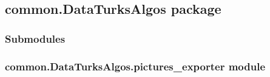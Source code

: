 \documentclass[letterpaper,10pt,english]{sphinxmanual}
\begin{document}
\subsection{common.DataTurksAlgos package}
\label{\detokenize{common.DataTurksAlgos:common-dataturksalgos-package}}\label{\detokenize{common.DataTurksAlgos::doc}}

\subsubsection{Submodules}
\label{\detokenize{common.DataTurksAlgos:submodules}}

\subsubsection{common.DataTurksAlgos.pictures\_exporter module}
\label{\detokenize{common.DataTurksAlgos:module-common.DataTurksAlgos.pictures_exporter}}\label{\detokenize{common.DataTurksAlgos:common-dataturksalgos-pictures-exporter-module}}
\end{document}
